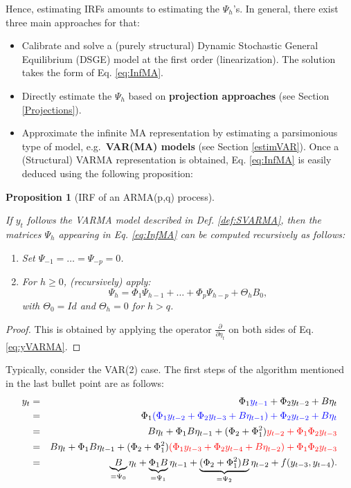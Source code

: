 \documentclass[
  12pt,
]{book}
\providecommand{\tightlist}{%
  \setlength{\itemsep}{0pt}\setlength{\parskip}{0pt}}
\newtheorem{proposition}{Proposition}[chapter]
\theoremstyle{definition}
\theoremstyle{definition}
\theoremstyle{definition}
\theoremstyle{definition}
\theoremstyle{remark}
\begin{document}
Hence, estimating IRFs amounts to estimating the \(\Psi_{h}\)'s. In general, there exist three main approaches for that:

\begin{itemize}
\tightlist
\item
  Calibrate and solve a (purely structural) Dynamic Stochastic General Equilibrium (DSGE) model at the first order (linearization). The solution takes the form of Eq. \eqref{eq:InfMA}.
\item
  Directly estimate the \(\Psi_{h}\) based on \textbf{projection approaches} (see Section \ref{Projections}).
\item
  Approximate the infinite MA representation by estimating a parsimonious type of model, e.g.~\textbf{VAR(MA) models} (see Section \ref{estimVAR}). Once a (Structural) VARMA representation is obtained, Eq. \eqref{eq:InfMA} is easily deduced using the following proposition:
\end{itemize}

\begin{proposition}[IRF of an ARMA(p,q) process]
\protect\hypertarget{prp:computPsi}{}\label{prp:computPsi}

If \(y_t\) follows the VARMA model described in Def. \ref{def:SVARMA}, then the matrices \(\Psi_h\) appearing in Eq. \eqref{eq:InfMA} can be computed recursively as follows:

\begin{enumerate}
\def\labelenumi{\arabic{enumi}.}
\tightlist
\item
  Set \(\Psi_{-1}=\dots=\Psi_{-p}=0\).
\item
  For \(h \ge 0\), (recursively) apply:
  \[
  \Psi_h = \Phi_1 \Psi_{h-1} + \dots + \Phi_p \Psi_{h-p} + \Theta_h B_0,
  \]
  with \(\Theta_0 = Id\) and \(\Theta_h = 0\) for \(h>q\).
\end{enumerate}

\end{proposition}

\begin{proof}
This is obtained by applying the operator \(\frac{\partial}{\partial \eta_{t}}\) on both sides of Eq. \eqref{eq:yVARMA}.
\end{proof}

Typically, consider the VAR(2) case. The first steps of the algorithm mentioned in the last bullet point are as follows:
\begin{eqnarray*}
y_t &=& \Phi_1 {\color{blue}y_{t-1}} + \Phi_2 y_{t-2} + B \eta_t  \\
&=& \Phi_1 \color{blue}{(\Phi_1 y_{t-2} + \Phi_2 y_{t-3} + B \eta_{t-1})} + \Phi_2 y_{t-2} + B \eta_t  \\
&=& B \eta_t + \Phi_1 B \eta_{t-1} + (\Phi_2 + \Phi_1^2) \color{red}{y_{t-2}} + \Phi_1\Phi_2 y_{t-3}  \\
&=& B \eta_t + \Phi_1 B \eta_{t-1} + (\Phi_2 + \Phi_1^2) \color{red}{(\Phi_1 y_{t-3} + \Phi_2 y_{t-4} + B \eta_{t-2})} + \Phi_1\Phi_2 y_{t-3} \\
&=& \underbrace{B}_{=\Psi_0} \eta_t + \underbrace{\Phi_1 B}_{=\Psi_1} \eta_{t-1} + \underbrace{(\Phi_2 + \Phi_1^2)B}_{=\Psi_2} \eta_{t-2} + f(y_{t-3},y_{t-4}).
\end{eqnarray*}
\end{document}
